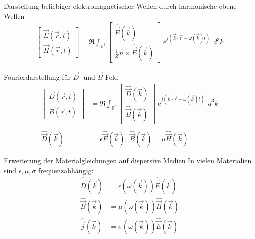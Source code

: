 \documentclass[a6paper]{kartei}
\begin{document}
\begin{karte}{Darstellung beliebiger elektromagnetischer Wellen durch harmonische ebene Wellen}
\begin{align}
\begin{bmatrix} \vec{E}(\vec{r},t) \\ \vec{H}(\vec{r},t) \end {bmatrix} = \Re \int_{\mathbb{R}^{3}} \begin{bmatrix} \hat{\vec{E}}(\vec{k}) \\ \frac{1}{Z} \vec{n} \times \hat{\vec{E}}(\vec{k}) \end{bmatrix} \operatorname{e}^{j(\vec{k} \cdot \vec{r} - \omega(\vec{k}) t)} \, d^{3}k
\end{align}
\end{karte}

\begin{karte}{Fourierdarstellung für $\vec{D}$- und $\vec{B}$-Feld}
\begin{align}
\begin{bmatrix} \vec{D}(\vec{r},t) \\ \vec{B}(\vec{r},t) \end {bmatrix} & = \Re \int_{\mathbb{R}^{3}} \begin{bmatrix} \hat{\vec{D}}(\vec{k}) \\ \hat{\vec{B}}(\vec{k}) \end{bmatrix} \operatorname{e}^{j(\vec{k} \cdot \vec{r} - \omega(\vec{k}) t)} \, d^{3}k  \\
\nonumber \\
\hat{\vec{D}}(\vec{k}) & = \epsilon \hat{\vec{E}}(\vec{k}), \ \hat{\vec{B}}(\vec{k}) = \mu \hat{\vec{H}}(\vec{k})
\end{align}
\end{karte}

\begin{karte}{Erweiterung der Materialgleichungen auf dispersive Medien}
In vielen Materialien sind $\epsilon, \mu, \sigma$ frequenzabhängig:
\begin{align}
\hat{\vec{D}}(\vec{k}) & = \epsilon(\omega(\vec{k})) \hat{\vec{E}}(\vec{k}) \\
\hat{\vec{B}}(\vec{k}) & = \mu(\omega(\vec{k})) \hat{\vec{H}}(\vec{k}) \\
\hat{\vec{j}}(\vec{k}) & = \sigma(\omega(\vec{k})) \hat{\vec{E}}(\vec{k})
\end{align}
\end{karte}
\end{document}
